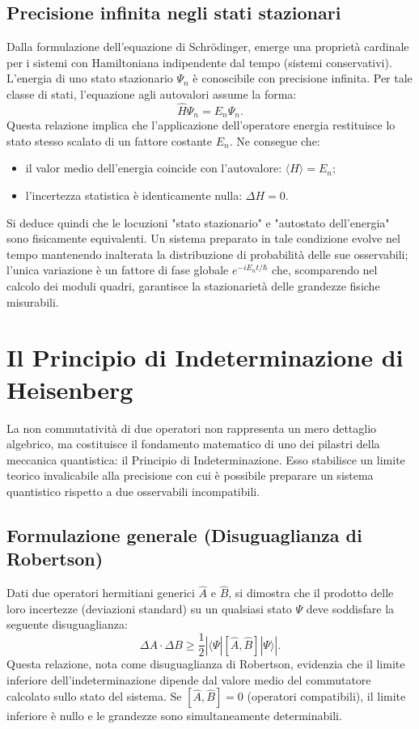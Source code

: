 \documentclass[a4paper,11pt]{report}
\begin{document}
\subsection{Precisione infinita negli stati stazionari}
Dalla formulazione dell'equazione di Schrödinger, emerge una proprietà cardinale per i sistemi con Hamiltoniana indipendente dal tempo (sistemi conservativi).
L'energia di uno stato stazionario $\Psi_n$ è conoscibile con precisione infinita. Per tale classe di stati, l'equazione agli autovalori assume la forma:
\begin{equation}
    \hat{H}\Psi_n = E_n\Psi_n.
\end{equation}
Questa relazione implica che l'applicazione dell'operatore energia restituisce lo stato stesso scalato di un fattore costante $E_n$. Ne consegue che:
\begin{itemize}
    \item il valor medio dell'energia coincide con l'autovalore: $\langle H \rangle = E_n$;
    \item l'incertezza statistica è identicamente nulla: $\Delta H = 0$.
\end{itemize}
Si deduce quindi che le locuzioni "stato stazionario" e "autostato dell'energia" sono fisicamente equivalenti.
Un sistema preparato in tale condizione evolve nel tempo mantenendo inalterata la distribuzione di probabilità delle sue osservabili; l'unica variazione è un fattore di fase globale $e^{-iE_n t/\hbar}$ che, scomparendo nel calcolo dei moduli quadri, garantisce la stazionarietà delle grandezze fisiche misurabili.

\section{Il Principio di Indeterminazione di Heisenberg}
La non commutatività di due operatori non rappresenta un mero dettaglio algebrico, ma costituisce il fondamento matematico di uno dei pilastri della meccanica quantistica: il Principio di Indeterminazione.
Esso stabilisce un limite teorico invalicabile alla precisione con cui è possibile preparare un sistema quantistico rispetto a due osservabili incompatibili.

\subsection{Formulazione generale (Disuguaglianza di Robertson)}
Dati due operatori hermitiani generici $\hat{A}$ e $\hat{B}$, si dimostra che il prodotto delle loro incertezze (deviazioni standard) su un qualsiasi stato $\Psi$ deve soddisfare la seguente disuguaglianza:
\begin{equation}
    \Delta A \cdot \Delta B \geq \frac{1}{2} \left| \langle \Psi | [\hat{A}, \hat{B}] | \Psi \rangle \right|.
\end{equation}
Questa relazione, nota come disuguaglianza di Robertson, evidenzia che il limite inferiore dell'indeterminazione dipende dal valore medio del commutatore calcolato sullo stato del sistema.
Se $[\hat{A}, \hat{B}] = 0$ (operatori compatibili), il limite inferiore è nullo e le grandezze sono simultaneamente determinabili.
\end{document}
